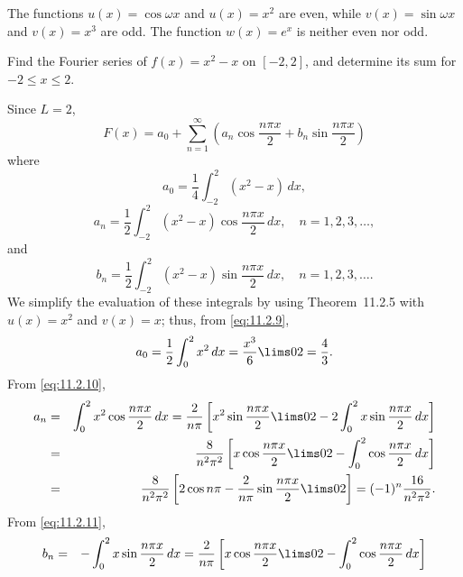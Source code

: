 \setcounter{example}{1}
\begin{example}
  \label{example:11.2.2} \rm The functions $u(x)=\cos\omega x$ and $u(x)=x^{2}$ are even, while
  $v(x)=\sin\omega x$ and $v(x)=x^{3}$ are odd. The function $w(x)=e^{x}$ is neither even nor odd.
\end{example}

\setcounter{example}{2}
\begin{example}
  \label{example:11.2.3} \rm Find the Fourier series of $f(x)=x^{2}-x$ on $[-2,2]$, and determine
  its sum for $-2\le x\le2$.
\end{example}
\setcounter{equation}{8}
\setcounter{figure}{2}
\begin{examplesolution}
\solution Since $L=2$,
\[
  F(x)=a_{0}+\sum_{n=1}^{\infty}\left(a_{n}\cos\frac{n\pi x}{2}+b_{n}\sin\frac{n\pi x}{2}\right)
\]
where
\begin{equation}
  \label{eq:11.2.9}a_{0}=\frac{1}{4}\int_{-2}^{2}(x^{2}-x)\,dx,
\end{equation}
\begin{equation}
  \label{eq:11.2.10}a_{n}=\frac{1}{2}\int_{-2}^{2}(x^{2}-x)\cos\frac{n\pi x}{2}\,dx,\quad n=1,2,3,\dots,
\end{equation}
and
\begin{equation}
  \label{eq:11.2.11}b_{n}=\frac{1}{2}\int_{-2}^{2}(x^{2}-x)\sin\frac{n\pi x}{2}\,dx,\quad n=1,2,3,\dots.
\end{equation}
We simplify the evaluation of these integrals by using Theorem~11.2.5 with
$u(x)=x^{2}$ and $v(x)=x$; thus, from \eqref{eq:11.2.9},
\[
  a_{0}=\frac{1}{2}\int_{0}^{2}x^{2}\,dx=\frac{x^{3}}{6}\lims02=\frac{4}{3}.
\]
From \eqref{eq:11.2.10},
\begin{eqnarray*}
  a_{n} & = & \int_{0}^{2}x^{2}\cos\frac{n\pi x}{2}\,dx=\frac{2}{n\pi}\left[x^{2}\sin\frac{n\pi x}{2}\lims02-2\int_{0}^{2}x\sin\frac{n\pi x}{2}\,dx\right] \\
        & = & \frac{8}{n^{2}\pi^{2}}\left[x\cos\frac{n\pi x}{2}\lims02-\int_{0}^{2}\cos\frac{n\pi x}{2}\,dx\right]                                         \\
        & = & \frac{8}{n^{2}\pi^{2}}\left[2\cos n\pi-\frac{2}{n\pi}\sin\frac{n\pi x}{2}\lims02\right]=(-1)^{n}\frac{16}{n^{2}\pi^{2}}.
\end{eqnarray*}
From \eqref{eq:11.2.11},
\begin{eqnarray*}
  b_{n} & = & -\int_{0}^{2}x\sin\frac{n\pi x}{2}\,dx=\frac{2}{n\pi}\left[x\cos\frac{n\pi x}{2}\lims02-\int_{0}^{2}\cos\frac{n\pi x}{2}\,dx\right] \\

\end{eqnarray*}
\end{examplesolution}
